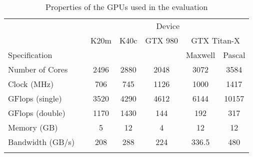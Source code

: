 \begin{table}[tb]	%
%
%
%
\setlength\tabcolsep{0.4em}
\center\begin{tabular}{lc c c c c c}
                         && \multicolumn{5}{c}{Device} \\
\cline{3-7}
                         && K20m  & K40c  & GTX 980 & \multicolumn{2}{c}{GTX Titan-X} \\
Specification            &&       &       &         & Maxwell     & Pascal \\
\cline{1-1}\cline{3-7}
Number of Cores          && 2496  & 2880  & 2048    & 3072        & 3584 \\
Clock (MHz)              && 706   & 745   & 1126    & 1000        & 1417 \\
GFlops (single)          && 3520  & 4290  & 4612    & 6144        & 10157 \\
GFlops (double)          && 1170  & 1430  & 144     & 192         & 317 \\
Memory (GB)              && 5     & 12    & 4       & 12          & 12 \\
Bandwidth (GB/s)         && 208   & 288   & 224     & 336.5       & 480 \\
\cline{1-1}\cline{3-7}
\\[-1.5ex]
\end{tabular}
\caption{Properties of the GPUs used in the evaluation}
\label{table-gpus}
\end{table}

